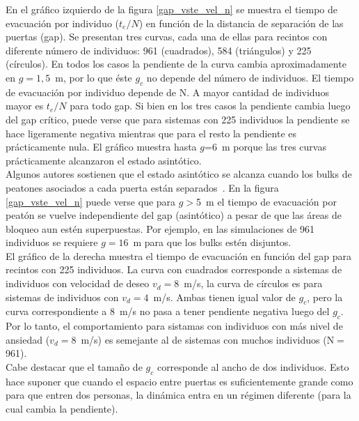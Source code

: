 En el gráfico izquierdo de la figura \ref{gap_vste_vel_n} se muestra el tiempo de evacuación por individuo ($t_e/N$) en función de la distancia de separación de las puertas (gap). Se presentan tres curvas, cada una de ellas para recintos con diferente número de individuos: 961 (cuadrados), 584 (triángulos) y 225 (círculos). En todos los casos la pendiente de la curva cambia aproximadamente en $g=1,5$~m, por lo que éste $g_c$ no depende del número de individuos. 
El tiempo de evacuación por individuo depende de N. A mayor cantidad de individuos mayor es $t_e/N$ para todo gap. 
Si bien en los tres casos la pendiente cambia luego del gap crítico, puede verse que para sistemas con 225 individuos la pendiente se hace ligeramente negativa mientras que para el resto la pendiente es prácticamente nula. El gráfico muestra hasta $g$=6~m porque las tres curvas prácticamente alcanzaron el estado asintótico. \\

Algunos autores sostienen que el estado asintótico se alcanza cuando los bulks de peatones asociados a cada puerta están separados~\cite{perez1}. En la figura \ref{gap_vste_vel_n} puede verse que para $g>$5~m el tiempo de evacuación por peatón se vuelve independiente del gap (asintótico) a pesar de que las áreas de bloqueo aun estén superpuestas. Por ejemplo, en las simulaciones de 961 individuos se requiere $g=16$~m para que los bulks estén disjuntos.\\

El gráfico de la derecha muestra el tiempo de evacuación en función del gap para recintos con 225 individuos. La curva con cuadrados corresponde a sistemas de individuos con velocidad de deseo $v_d=8$~m/s, la curva de círculos es para sistemas de individuos con $v_d=4$~m/s. Ambas tienen igual valor de $g_c$, pero la curva correspondiente a 8~m/s no pasa a tener pendiente negativa luego del $g_c$. Por lo tanto, el comportamiento para sistamas con individuos con más nivel de ansiedad ($v_d=8$~m/s) es semejante al de sistemas con muchos individuos (N$=$961). \\

Cabe destacar que el tamaño de $g_c$ corresponde al ancho de dos individuos. Esto hace suponer que cuando el espacio entre puertas es suficientemente grande como para que entren dos personas, la dinámica entra en un régimen diferente (para la cual cambia la pendiente). 

